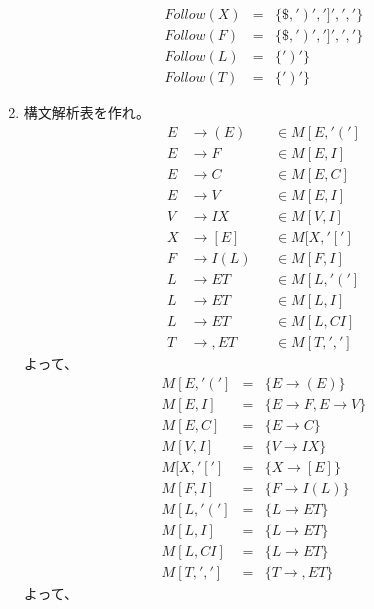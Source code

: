 \documentclass[a4paper,12pt]{jarticle}
\begin{document}
\begin{enumerate}
\begin{eqnarray*}
Follow \left( X \right) & = & \{ \$ , ' \left. \right) ' , ' ] ' , ' , ' \} \\
Follow \left( F \right) & = & \{ \$ , ' \left. \right) ' , ' ] ' , ' , ' \} \\
Follow \left( L \right) & = & \{ ' \left. \right) ' \} \\
Follow \left( T \right) & = & \{ ' \left. \right) ' \}
\end{eqnarray*}
\item 構文解析表を作れ。
\begin{align*}
E & \rightarrow \left( E \right) & & \in M [ E , ' \left( \right. ' ] \\
E & \rightarrow F & & \in M [ E , I ] \\
E & \rightarrow C & & \in M [ E , C ] \\
E & \rightarrow V & & \in M [ E , I ] \\
V & \rightarrow I X & & \in M [ V , I ] \\
X & \rightarrow [ E ] & & \in M [ X , ' [ ' ] \\
F & \rightarrow I \left( L \right) & & \in M [ F , I ] \\
L & \rightarrow E T & & \in M [ L , ' \left( \right. ' ] \\
L & \rightarrow E T & & \in M [ L , I ] \\
L & \rightarrow E T & & \in M [ L ,CI ] \\
T & \rightarrow , E T & & \in M [ T , ' , ' ]
\end{align*}
よって、
\begin{eqnarray*}
M [ E , ' \left( \right. ' ] & = & \{ E \rightarrow \left( E \right) \} \\
M [ E , I ] & = & \{ E \rightarrow F , E \rightarrow V \} \\
M [ E , C ] & = & \{ E \rightarrow C \} \\
M [ V , I ] & = & \{ V \rightarrow I X \} \\
M [ X , ' [ ' ] & = & \{ X \rightarrow [ E ] \} \\
M [ F , I ] & = & \{ F \rightarrow I \left( L \right) \} \\
M [ L , ' \left( \right. ' ] & = & \{ L \rightarrow E T \} \\
M [ L , I ] & = & \{ L \rightarrow E T \} \\
M [ L ,CI ] & = & \{ L \rightarrow E T \} \\
M [ T , ' , ' ] & = & \{ T \rightarrow , E T \}
\end{eqnarray*}
よって、
\begin{table}[H]

\end{table}
\end{enumerate}
\end{document}

